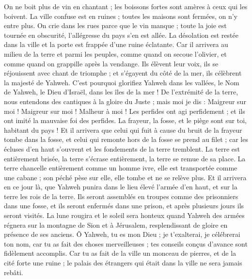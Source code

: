 \begin{multicols}{2}
On ne boit plus de vin en chantant ; les boissons fortes sont amères à ceux qui les boivent.
La ville confuse est en ruines ; toutes les maisons sont fermées, on n'y entre plus.
On crie dans les rues parce que le vin manque ; toute la joie est tournée en obscurité, l'allégresse du pays s'en est allée.
La désolation est restée dans la ville et la porte est frappée d'une ruine éclatante.
Car il arrivera au milieu de la terre et parmi les peuples, comme quand on secoue l'olivier, et comme quand on grappille après la vendange.
Ils élèvent leur voix, ils se réjouissent avec chant de triomphe ; et s'égayent du côté de la mer, ils célèbrent la majesté de Yahweh.
C'est pourquoi glorifiez Yahweh dans les vallées, le Nom de Yahweh, le Dieu d'Israël, dans les îles de la mer !
De l'extrémité de la terre, nous entendons des cantiques à la gloire du Juste ; mais moi je dis : Maigreur sur moi ! Maigreur sur moi ! Malheur à moi ! Les perfides ont agi perfidement ; et ils ont imité la mauvaise foi des perfides.
La frayeur, la fosse, et le piège sont sur toi, habitant du pays !
Et il arrivera que celui qui fuit à cause du bruit de la frayeur tombe dans la fosse, et celui qui remonte hors de la fosse se prend au filet ; car les écluses d'en haut s'ouvrent et les fondements de la terre tremblent.
La terre est entièrement brisée, la terre s'écrase entièrement, la terre se remue de sa place.
La terre chancelle entièrement comme un homme ivre, elle est transportée comme une cabane ; son péché pèse sur elle, elle tombe et ne se relève plus.
Et il arrivera en ce jour là, que Yahweh punira dans le lieu élevé l'armée d'en haut, et sur la terre les rois de la terre.
Ils seront assemblés en troupes comme des prisonniers dans une fosse, et ils seront enfermés dans une prison, et après plusieurs jours ils seront visités.
La lune rougira et le soleil sera honteux quand Yahweh des armées régnera sur la montagne de Sion et à Jérusalem, resplendissant de gloire en présence de ses anciens.
\VerseOne{}Ô Yahweh, tu es mon Dieu ; je t'exalterai, je célébrerai ton nom, car tu as fait des choses merveilleuses ; tes conseils conçus d'avance sont fidèlement accomplis.
Car tu as fait de la ville un monceau de pierres, et de la cité forte une ruine ; le palais des étrangers qui était dans la ville ne sera jamais rebâti.

\end{multicols}
